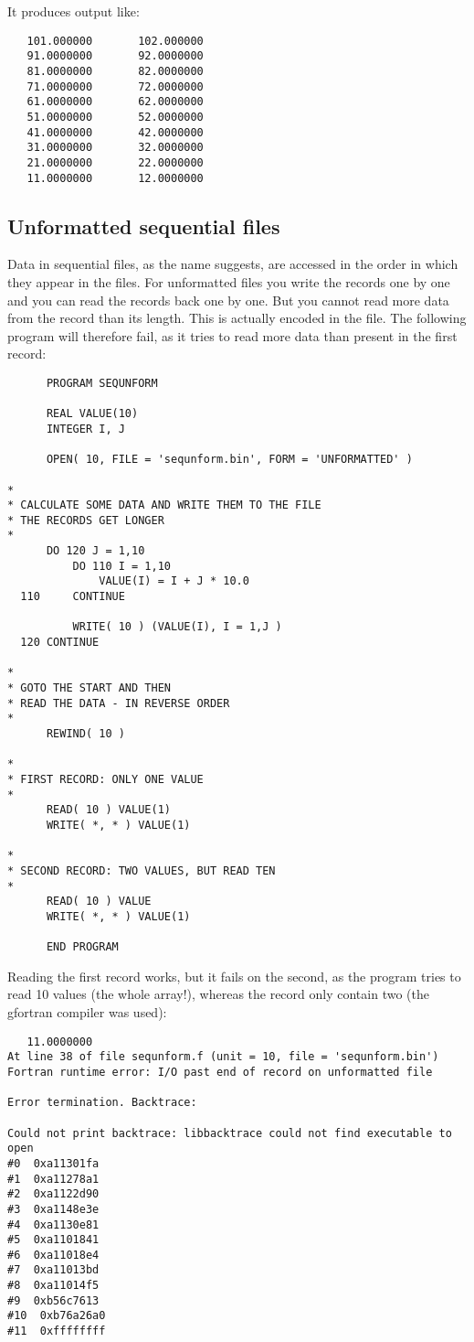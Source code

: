 It produces output like:
\begin{verbatim}
   101.000000       102.000000
   91.0000000       92.0000000
   81.0000000       82.0000000
   71.0000000       72.0000000
   61.0000000       62.0000000
   51.0000000       52.0000000
   41.0000000       42.0000000
   31.0000000       32.0000000
   21.0000000       22.0000000
   11.0000000       12.0000000
\end{verbatim}


\subsection{Unformatted sequential files}
Data in sequential files, as the name suggests, are accessed in the order in which they appear in the files.
For unformatted files you write the records one by one and you can read the records back one by one.
But you cannot read more data from the record than its length. This is actually encoded in the file.
The following program will therefore fail, as it tries to read more data than present in the first
record:

\begin{verbatim}
      PROGRAM SEQUNFORM

      REAL VALUE(10)
      INTEGER I, J

      OPEN( 10, FILE = 'sequnform.bin', FORM = 'UNFORMATTED' )

*
* CALCULATE SOME DATA AND WRITE THEM TO THE FILE
* THE RECORDS GET LONGER
*
      DO 120 J = 1,10
          DO 110 I = 1,10
              VALUE(I) = I + J * 10.0
  110     CONTINUE

          WRITE( 10 ) (VALUE(I), I = 1,J )
  120 CONTINUE

*
* GOTO THE START AND THEN
* READ THE DATA - IN REVERSE ORDER
*
      REWIND( 10 )

*
* FIRST RECORD: ONLY ONE VALUE
*
      READ( 10 ) VALUE(1)
      WRITE( *, * ) VALUE(1)

*
* SECOND RECORD: TWO VALUES, BUT READ TEN
*
      READ( 10 ) VALUE
      WRITE( *, * ) VALUE(1)

      END PROGRAM
\end{verbatim}

Reading the first record works, but it fails on the second, as the program
tries to read 10 values (the whole array!), whereas the record only contain two
(the gfortran compiler was used):

\begin{verbatim}
   11.0000000
At line 38 of file sequnform.f (unit = 10, file = 'sequnform.bin')
Fortran runtime error: I/O past end of record on unformatted file

Error termination. Backtrace:

Could not print backtrace: libbacktrace could not find executable to open
#0  0xa11301fa
#1  0xa11278a1
#2  0xa1122d90
#3  0xa1148e3e
#4  0xa1130e81
#5  0xa1101841
#6  0xa11018e4
#7  0xa11013bd
#8  0xa11014f5
#9  0xb56c7613
#10  0xb76a26a0
#11  0xffffffff
\end{verbatim}

